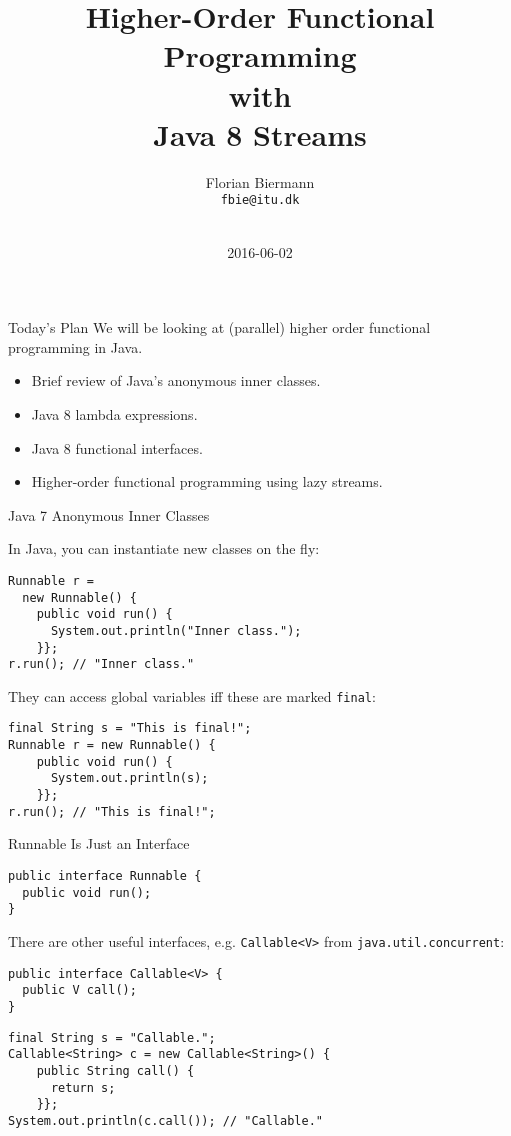 \documentclass{beamer}
\title{Higher-Order Functional Programming\\with\\Java 8 Streams}
\author{Florian Biermann \\\small{\texttt{fbie@itu.dk}} \\~}
\institute{IT University of Copenhagen \& UCAS}
\date{2016-06-02}
\begin{document}
\begin{frame}
  \titlepage{}
\end{frame}

\begin{frame}{Today's Plan}
  We will be looking at (parallel) higher order functional programming in Java.

  \begin{itemize}
  \pause{} \item Brief review of Java's anonymous inner classes.
  \pause{} \item Java 8 lambda expressions.
  \pause{} \item Java 8 functional interfaces.
  \pause{} \item Higher-order functional programming using lazy streams.
  \end{itemize}
\end{frame}

\begin{frame}[fragile]{Java 7 Anonymous Inner Classes}

In Java, you can instantiate new classes on the fly:

\begin{lstlisting}
Runnable r =
  new Runnable() {
    public void run() {
      System.out.println("Inner class.");
    }};
r.run(); // "Inner class."
\end{lstlisting}

\pause{} \vspace{0.25cm}

They can access global variables iff these are marked \lstinline{final}:

\begin{lstlisting}
final String s = "This is final!";
Runnable r = new Runnable() {
    public void run() {
      System.out.println(s);
    }};
r.run(); // "This is final!";
\end{lstlisting}
\end{frame}

\begin{frame}[fragile]{Runnable Is Just an Interface}

\begin{lstlisting}
public interface Runnable {
  public void run();
}
\end{lstlisting}

\pause{} \vspace{0.25cm}

There are other useful interfaces, e.g. \lstinline{Callable<V>} from \lstinline{java.util.concurrent}:

\begin{lstlisting}
public interface Callable<V> {
  public V call();
}
\end{lstlisting}
\pause{}
\begin{lstlisting}
final String s = "Callable.";
Callable<String> c = new Callable<String>() {
    public String call() {
      return s;
    }};
System.out.println(c.call()); // "Callable."
\end{lstlisting}
\end{frame}
\end{document}

